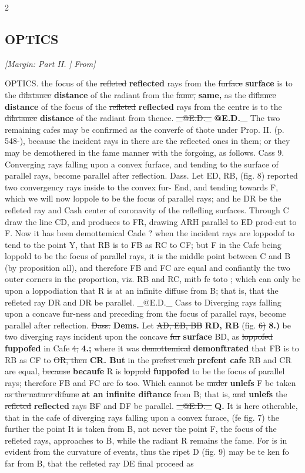 \documentclass[10pt]{article}
\begin{document}
\begin{multicols}{2}
\subsection*{OPTICS}
{\small\itshape [Margin: Part II. | From]}\par
OPTICS. the focus of the \sout{refleted} \textbf{reflected} rays from the \sout{furface} \textbf{surface} is to the \sout{dilatance} \textbf{distance} of the radiant from the \sout{fame,} \textbf{same,} as the \sout{diflance} \textbf{distance} of the focus of the \sout{refleted} \textbf{reflected} rays from the centre is to the \sout{dilatance} \textbf{distance} of the radiant from thence. \sout{\_@E.D.\_} \textbf{@E.D.\_} The two remaining cafes may be confirmed as the converfe of thote under Prop. II. (p. 548-), because the incident rays in there are the reflected ones in them; or they may be demothered in the fame manner with the forgoing, as follows. Cass 9. Converging rays falling upon a convex furface, and tending to the surface of parallel rays, become parallel after reflection. Dass. Let ED, RB, (fig. 8) reported two convergency rays inside to the convex fur- End, and tending towards F, which we will now loppole to be the focus of parallel rays; and he DR be the refleted ray and Cash center of coronavity of the reflefling surfaces. Through C draw the line CD, and produces to FR, drawing ARH parallel to ED prod-cut to F. Now it has been demottemical Cade ? when the incident rays are loppodof to tend to the point Y, that RB is to FB as RC to CF; but F in the Cafe being loppold to be the focus of parallel rays, it is the middle point between C and B (by proposition all), and therefore FB and FC are equal and confiantly the two outer corners in the proportion, viz. RB and RC, mitb fe toto ; which can only be upon a loppodiation that R is at an infinite diffuse from B; that is, that the refleted ray DR and DR be parallel. \_@E.D.\_ Cass to Diverging rays falling upon a concave fur-ness and preceding from the focus of parallel rays, become parallel after reflection. \sout{Dass.} \textbf{Dems.} Let \sout{AD, EB, BB} \textbf{RD, RB} (fig. \sout{6)} \textbf{8.)} be two diverging rays incident upon the concave \sout{fur} \textbf{surface} BD, as \sout{loppofed} \textbf{fuppofed} in Cafe \sout{4;} \textbf{4.;} where it was \sout{demottemical} \textbf{demonftrated} that FB is to RB as CF to \sout{OR, then} \textbf{CR. But} in the \sout{prefect each} \textbf{prefent cafe} RB and CR are equal, \sout{because} \textbf{becaufe} R is \sout{loppold} \textbf{fuppofed} to be the focus of parallel rays; therefore FB and FC are fo too. Which cannot be \sout{under} \textbf{unlefs} F be taken \sout{as the nature difame} \textbf{at an infinite diftance} from B; that is, \sout{and} \textbf{unlefs} the \sout{refleted} \textbf{reflected} rays BF and DF be parallel. \sout{\_@E.D.\_} \textbf{Q.} It is here otherable, that in the cafe of diverging rays falling upon a convex furace, (fe fig. 7) the further the point It is taken from B, not never the point F, the focus of the refleted rays, approaches to B, while the radiant R remains the fame. For is in evident from the curvature of events, thus the ripet D (fig. 9) may be te ken fo far from B, that the refleted ray DE final proceed as 
\end{multicols}
\end{document}
